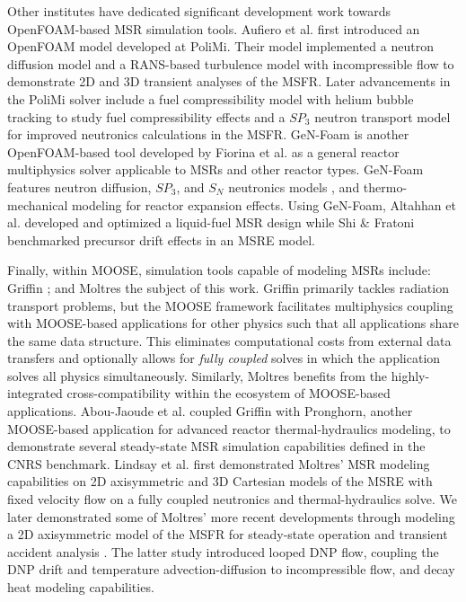 Other institutes have dedicated significant development work towards
OpenFOAM-based \gls{MSR} simulation tools. Aufiero et al.
\cite{aufiero_development_2014} first introduced an OpenFOAM model developed
at \gls{PoliMi}. Their model implemented a neutron diffusion model and a
\gls{RANS}-based turbulence model with incompressible flow to demonstrate 2D
and 3D transient analyses of the \gls{MSFR}. Later advancements in the
\gls{PoliMi} solver include a fuel compressibility model with helium bubble
tracking to study fuel compressibility effects
\cite{cervi_development_2019} and a $SP_3$ neutron transport
model for improved neutronics calculations \cite{cervi_development_2019-1} in
the \gls{MSFR}. GeN-Foam is another OpenFOAM-based tool developed by Fiorina
et al. \cite{fiorina_gen-foam_2015} as a general reactor multiphysics solver
applicable to \glspl{MSR} and other reactor types. GeN-Foam features neutron
diffusion, $SP_3$, and $S_N$ neutronics models 
\cite{fiorina_development_2016,fiorina_gen-foam_2015,fiorina_detailed_2019},
and thermo-mechanical modeling for reactor expansion effects. Using GeN-Foam,
Altahhan et al. \cite{altahhan_preliminary_2020} developed and optimized a
liquid-fuel \gls{MSR} design while Shi \& Fratoni \cite{shi_gen-foam_2021}
benchmarked precursor drift effects in an \gls{MSRE} model.

Finally, within MOOSE, simulation tools capable of modeling
\glspl{MSR} include: Griffin \cite{wang_rattlesnake_2021}; and Moltres
\cite{lindsay_moltres_2017}\textemdash the subject of this work.
Griffin primarily tackles radiation transport problems, but the MOOSE
framework facilitates multiphysics coupling
with MOOSE-based applications for other physics
such that all applications share the same data structure. This eliminates
computational costs from external data transfers and optionally allows for
\textit{fully coupled} solves in which the application solves all physics
simultaneously. Similarly, Moltres benefits from the highly-integrated
cross-compatibility
within the ecosystem of MOOSE-based applications. Abou-Jaoude et al.
\cite{abou-jaoude_coupled_2020} coupled Griffin with Pronghorn, another
MOOSE-based application for advanced reactor thermal-hydraulics modeling, to
demonstrate several steady-state \gls{MSR} simulation capabilities defined in
the CNRS benchmark. Lindsay et al.
\cite{lindsay_introduction_2018} first demonstrated Moltres' \gls{MSR} modeling
capabilities on 2D axisymmetric and 3D Cartesian models of the \gls{MSRE} with
fixed velocity flow on a fully coupled neutronics and thermal-hydraulics solve.
We later demonstrated some of Moltres' more recent developments through
modeling a 2D axisymmetric model of the \gls{MSFR} for steady-state operation
and transient accident analysis \cite{park_advancement_2020}. The latter study
introduced looped \gls{DNP} flow, coupling the \gls{DNP} drift and temperature 
advection-diffusion to incompressible flow, and decay heat modeling
capabilities.

